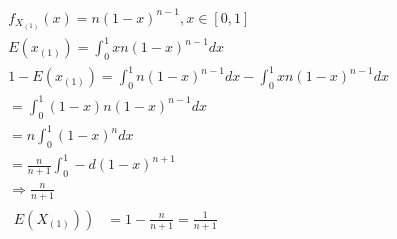 \documentclass[14pt]{scrartcl} %
\numberwithin{equation}{section} %
\numberwithin{figure}{section} %
\numberwithin{table}{section} %
\begin{document}
	$$
	\begin{aligned}
		&f_{X_{(1)}}(x)=n(1-x)^{n-1}, x \in[0,1] \\
		& E\left(x_{(1)}\right)=\int_{0}^{1} x n(1-x)^{n-1} d x \\
		& 1-E\left(x_{(1)}\right)=\int_{0}^{1} n(1-x)^{n-1} d x-\int_{0}^{1} x n(1-x)^{n-1} d x \\
		& =\int_{0}^{1}(1-x) n(1-x)^{n-1} d x \\
		& =n \int_{0}^{1}(1-x)^{n} d x \\
		& =\frac{n}{n+1} \int_{0}^{1}-d(1-x)^{n+1} \\
		& \Rightarrow \frac{n}{n+1} \\
		& \begin{aligned}
			\left.E\left(X_{(1)}\right)\right) & =1-\frac{n}{n+1}=\frac{1}{n+1}
		\end{aligned}
	\end{aligned}
	$$
	
	
\end{document}
